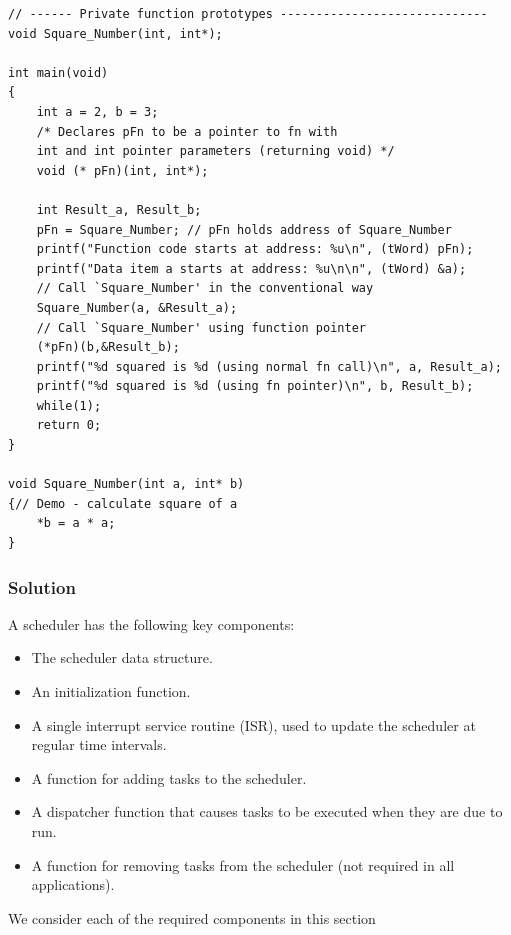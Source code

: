 \begin{lstlisting}[basicstyle=\small, caption=Example of how to use function pointers]
// ------ Private function prototypes -----------------------------
void Square_Number(int, int*);

int main(void)
{
    int a = 2, b = 3; 
    /* Declares pFn to be a pointer to fn with 
    int and int pointer parameters (returning void) */
    void (* pFn)(int, int*);
    
    int Result_a, Result_b;
    pFn = Square_Number; // pFn holds address of Square_Number
    printf("Function code starts at address: %u\n", (tWord) pFn);
    printf("Data item a starts at address: %u\n\n", (tWord) &a);
    // Call `Square_Number' in the conventional way
    Square_Number(a, &Result_a);
    // Call `Square_Number' using function pointer
    (*pFn)(b,&Result_b);
    printf("%d squared is %d (using normal fn call)\n", a, Result_a); 
    printf("%d squared is %d (using fn pointer)\n", b, Result_b); 
    while(1);
    return 0;
}

void Square_Number(int a, int* b)
{// Demo - calculate square of a
    *b = a * a;
}
\end{lstlisting}

\subsubsection{Solution}
A scheduler has the following key components:
\begin{itemize}
    \item  The scheduler data structure.
    \item  An initialization function.
    \item  A single interrupt service routine (ISR), used to update the scheduler at regular time
    intervals.
    \item  A function for adding tasks to the scheduler.
    \item  A dispatcher function that causes tasks to be executed when they are due to run.
    \item  A function for removing tasks from the scheduler (not required in all applications).
\end{itemize}

We consider each of the required components in this section

